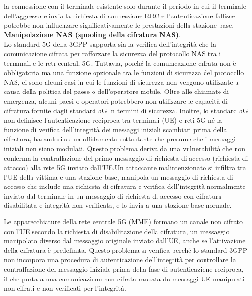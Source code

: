 \documentclass[english]{article}
\begin{document}
la connessione con il terminale esistente solo durante il periodo in cui il
terminale dell'aggressore invia la richiesta di connessione RRC e l'autenticazione
fallisce potrebbe non influenzare significativamente le prestazioni della stazione base.
\\[0.2cm]
\textbf{Manipolazione NAS (spoofing della cifratura NAS)}. \\Lo standard 5G della 3GPP supporta sia
la verifica dell'integrità che la comunicazione cifrata per rafforzare la sicurezza del
protocollo NAS tra i terminali e le reti centrali 5G. Tuttavia, poiché la comunicazione
cifrata non è obbligatoria ma una funzione opzionale tra le funzioni di sicurezza del
protocollo NAS, ci sono alcuni casi in cui le funzioni di sicurezza non vengono utilizzate
a causa della politica del paese o dell'operatore mobile. Oltre alle chiamate di emergenza,
alcuni paesi o operatori potrebbero non utilizzare le capacità di cifratura fornite dagli
standard 5G in termini di sicurezza. Inoltre, lo standard 5G non definisce l'autenticazione
reciproca tra terminali (UE) e reti 5G né la funzione di verifica dell'integrità dei messaggi
iniziali scambiati prima della cifratura, basandosi su un affidamento sottostante che presume
che i messaggi iniziali non siano modulati. Questo problema deriva da una vulnerabilità
che non conferma la contraffazione del primo messaggio di richiesta di accesso (richiesta di attacco)
alla rete 5G inviato dall'UE.\@ Un attaccante malintenzionato si infiltra tra l'UE della vittima e
una stazione base, manipola un messaggio di richiesta di accesso che include una richiesta di
cifratura e verifica dell'integrità normalmente inviato dal terminale in un messaggio di richiesta
di accesso con cifratura disabilitata e integrità non verificata, e lo invia a una stazione base normale.

Le apparecchiature della rete centrale 5G (MME) formano un canale non cifrato
con l'UE secondo la richiesta di disabilitazione della cifratura, un messaggio
manipolato diverso dal messaggio originale inviato dall'UE, anche se
l'attivazione della cifratura è predefinita. Questo problema si verifica perché
lo standard 3GPP non incorpora una procedura di autenticazione dell'integrità
per controllare la contraffazione del messaggio iniziale prima della fase di
autenticazione reciproca, il che porta a una comunicazione non cifrata causata
da messaggi UE manipolati non cifrati e non verificati per l'integrità.
\end{document}
